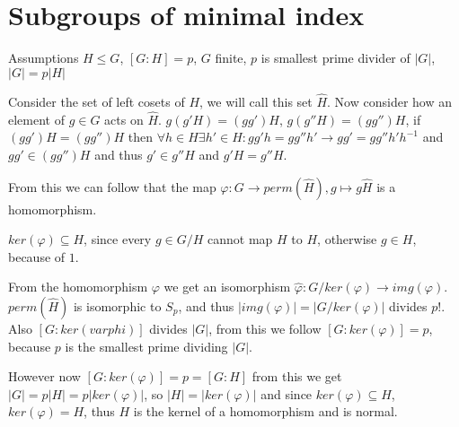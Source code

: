 \section{Subgroups of minimal index}
Assumptions $H \leq G$, $[G:H]=p$, $G$ finite, $p$ is smallest prime divider of $|G|$, $|G|=p|H|$

Consider the set of left cosets of $H$, we will call this set $\hat{H}$. Now consider how an element of $g\in G$ acts on $\hat{H}$. $g(g'H)=(gg')H$, $g(g''H)=(gg'')H$, if $(gg')H=(gg'')H$ then $\forall h \in H \exists h' \in H : gg'h=gg''h' \rightarrow gg'=gg''h'h^{-1}$ and $gg' \in (gg'')H$ and thus $g' \in g''H$ and $g'H=g''H$. 

From this we can follow that the map $\varphi : G \rightarrow perm(\hat{H}), g \mapsto g\hat{H}$ is a homomorphism.

$ker(\varphi) \subseteq H$, since every $g \in G/H$ cannot map $H$ to $H$, otherwise $g \in H$, because of $1$. 

From the homomorphism $\varphi$ we get an isomorphism $\hat{\varphi}: G/ker(\varphi) \rightarrow img(\varphi)$. $perm(\hat{H})$ is isomorphic to $S_p$, and thus $|img(\varphi)|=|G/ker(\varphi)|$ divides $p!$. Also $[G:ker(varphi)]$ divides $|G|$, from this we follow $[G:ker(\varphi)]=p$, because $p$ is the smallest prime dividing $|G|$. 

However now $[G:ker(\varphi)]=p=[G:H]$ from this we get $|G|=p|H|=p|ker(\varphi)|$, so $|H|=|ker(\varphi)|$ and since $ker(\varphi) \subseteq H$, $ker(\varphi)=H$, thus $H$ is the kernel of a homomorphism and is normal. 